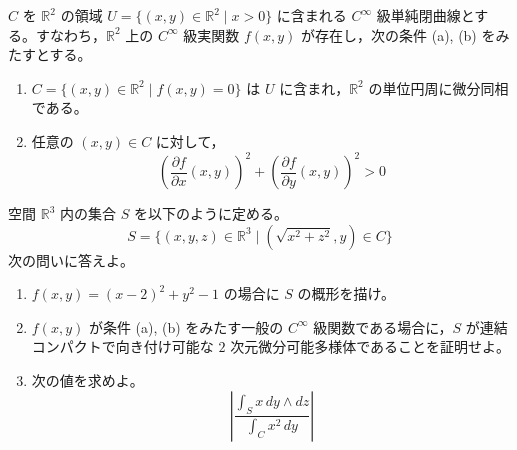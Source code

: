 \documentclass[12pt]{jlreq}
\newcommand{\R}{\mathbb{R}}
\begin{document}
$C$ を $\R^2$ の領域 $U = \{ (x,y) \in \R^2 \mid x > 0 \}$ に含まれる $C^\infty$ 級単純閉曲線とする。すなわち，$\R^2$ 上の $C^\infty$ 級実関数 $f(x,y)$ が存在し，次の条件 (a), (b) をみたすとする。
\begin{enumerate}
  \item[(a)] $C = \{ (x,y) \in \R^2 \mid f(x,y) = 0 \}$ は $U$ に含まれ，$\R^2$ の単位円周に微分同相である。
  \item[(b)] 任意の $(x,y) \in C$ に対して，
  \[
    \left(\frac{\partial f}{\partial x}(x,y)\right)^2 + \left(\frac{\partial f}{\partial y}(x,y)\right)^2 > 0
  \]
\end{enumerate}
空間 $\R^3$ 内の集合 $S$ を以下のように定める。
\[
  S = \{ (x,y,z) \in \R^3 \mid (\sqrt{x^2+z^2}, y) \in C \}
\]
次の問いに答えよ。

\begin{enumerate}
  \item $f(x,y) = (x-2)^2 + y^2 - 1$ の場合に $S$ の概形を描け。
  \item $f(x,y)$ が条件 (a), (b) をみたす一般の $C^\infty$ 級関数である場合に，$S$ が連結コンパクトで向き付け可能な $2$ 次元微分可能多様体であることを証明せよ。
  \item 次の値を求めよ。
  \[
    \left| \frac{\int_S x \, dy \wedge dz}{\int_C x^2 \, dy} \right|
  \]
\end{enumerate}
\end{document}
